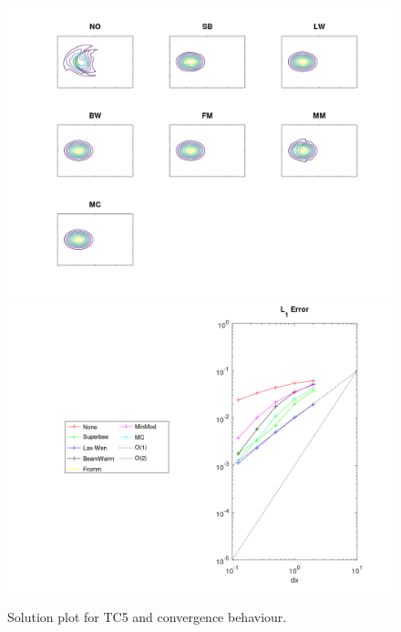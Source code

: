 \begin{figure}[htbp]\vspace*{0cm}\hspace*{0cm}
\includegraphics[angle=0,scale=0.3]{Figures/Apx_Test/TC5_LL_compare.png}
\includegraphics[angle=0,scale=0.3]{Figures/Apx_Test/TC5_LL_Solution_Error_L1.png}
\parbox{15cm}{\caption{\label{FigTest_ConvTC5}
Solution plot for TC5 and convergence behaviour.
}}
\end{figure}

\clearpage
